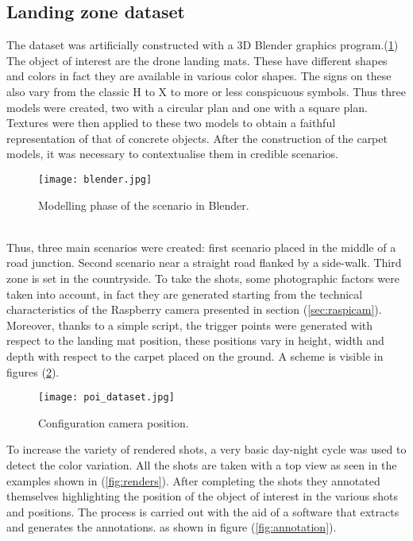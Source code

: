 \subsection{Landing zone dataset}
\label{ssec:landing-zone}
%
The dataset was artificially constructed with a 3D Blender graphics program.(\ref{fig:blender})\\ 
The object of interest are the drone landing mats. These have different shapes
and colors in fact they are available in various color shapes. The signs on
these also vary from the classic H to X to more or less conspicuous symbols.
Thus three models were created, two with a circular plan and one with a square
plan. Textures were then applied to these two models to obtain a faithful
representation of that of concrete objects. \hfill \break
After the construction of the carpet models, it was necessary to contextualise 
them in credible scenarios. \hfill \break
%
\begin{figure}[htb]
	\centering
	\texttt{[image: blender.jpg]}
	\caption{Modelling phase of the scenario in Blender.}
	\label{fig:blender}
\end{figure}
%
\\Thus, three main scenarios were created: first scenario placed in the middle of a road
junction. Second scenario near a straight road flanked by a side-walk.
Third zone is set in the countryside. To take the shots, some photographic
factors were taken into account, in fact they are generated starting from the
technical characteristics of the Raspberry camera presented in section
(\ref{sec:raspicam}). Moreover, thanks to a simple script, the trigger points
were generated with respect to the landing mat position, these positions vary in
height, width and depth with respect to the carpet placed on the ground.
A scheme is visible in figures (\ref{fig:poi_dataset}). \hfill \break
%
\begin{figure}[htb]
	\centering
	\texttt{[image: poi\_dataset.jpg]}
	\caption{Configuration camera position.}
	\label{fig:poi_dataset}
\end{figure}
%
\newpage
To increase the variety of rendered shots, a very basic day-night cycle was
used to detect the color variation. All the shots are taken with a top view as
seen in the examples shown in (\ref{fig:renders}).
After completing the shots they annotated themselves highlighting the position
of the object of interest in the various shots and positions.
The process is carried out with the aid of a software that extracts and
generates the annotations. as shown in figure (\ref{fig:annotation}).
